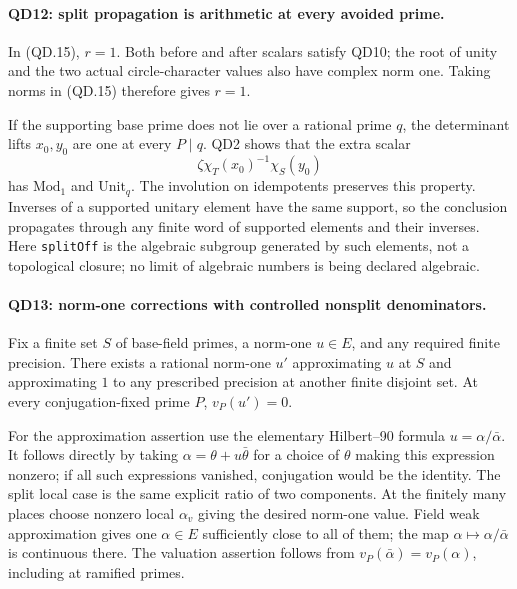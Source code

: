 \paragraph{QD12: split propagation is arithmetic at every avoided prime.}
In (QD.15), $r=1$.  Both before and after scalars satisfy QD10;
the root of unity and the two actual circle-character values
also have complex norm one.  Taking norms in (QD.15) therefore
gives $r=1$.

If the supporting base prime does not lie over a rational prime
$q$, the determinant lifts $x_0,y_0$ are one at every $P\mid q$.
QD2 shows that the extra scalar
\[
                       \zeta\chi_T(x_0)^{-1}\chi_S(y_0)
                                                               \tag{QD.17}
\]
has $\mathrm{Mod}_1$ and $\mathrm{Unit}_q$.  The involution on
idempotents preserves this property.  Inverses of a supported
unitary element have the same support, so the conclusion
propagates through any finite word of supported elements and
their inverses.  Here \texttt{splitOff} is the algebraic subgroup
generated by such elements, not a topological closure; no limit
of algebraic numbers is being declared algebraic.

\paragraph{QD13: norm-one corrections with controlled nonsplit denominators.}
Fix a finite set $S$ of base-field primes, a norm-one $u\in E$,
and any required finite precision.  There exists a rational
norm-one $u'$ approximating $u$ at $S$ and approximating $1$
to any prescribed precision at another finite disjoint set.
At every conjugation-fixed prime $P$, $v_P(u')=0$.

For the approximation assertion use the elementary Hilbert--90
formula $u=\alpha/\bar\alpha$.  It follows directly by taking
$\alpha=\theta+u\bar\theta$ for a choice of $\theta$ making
this expression nonzero; if all such expressions vanished,
conjugation would be the identity.  The split local case is the
same explicit ratio of two components.  At the finitely many
places choose nonzero local $\alpha_v$ giving the desired
norm-one value.  Field weak approximation gives one
$\alpha\in E$ sufficiently close to all of them; the map
$\alpha\mapsto\alpha/\bar\alpha$ is continuous there.
The valuation assertion follows from
$v_P(\bar\alpha)=v_P(\alpha)$, including at ramified primes.


